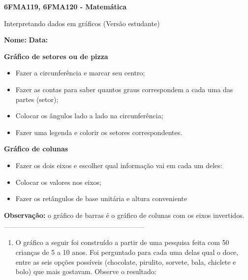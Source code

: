\documentclass[a4paper,14pt]{article}
\begin{document}
	
	\noindent\textbf{6FMA119, 6FMA120 - Matemática} 
	
	\begin{center}Interpretando dados em gráficos (Versão estudante)
	\end{center}
	
	\noindent\textbf{Nome:} \underline{\hspace{10cm}}
	\noindent\textbf{Data:} \underline{\hspace{4cm}}
	
	
	\begin{multicols}{2}
	    \noindent \textbf{Gráfico de setores ou de pizza} \\
	    \begin{itemize}
	    	\item Fazer a circunferência e marcar seu centro;
	    	\item Fazer as contas para saber quantos graus correspondem a cada uma das partes (setor);
	    	\item Colocar os ângulos lado a lado na circunferência;
	    	\item Fazer uma legenda e colorir os setores correspondentes.
	    \end{itemize}
	    \textbf{Gráfico de colunas} \\
	    \begin{itemize}
	    	\item Fazer os dois eixos e escolher qual informação vai em cada um deles:
	    	\item Colocar os valores nos eixos;
	    	\item Fazer os retângulos de base unitária e altura conveniente
	    \end{itemize}
	    \textbf{Observação: }o gráfico de barras é o gráfico de colunas com os eixos invertidos.
		\noindent\textsubscript{--------------------------------------------------------------------------}
		\begin{enumerate} 
			\item O gráfico a seguir foi construído a partir de uma pesquisa feita com 50 crianças de 5 a 10 anos. Foi perguntado para cada uma delas qual o doce, entre as seis opções possíveis (chocolate, pirulito, sorvete, bala, chiclete e bolo) que mais gostavam. Observe o resultado: \\\\

\end{enumerate}
\end{multicols}
\end{document}
